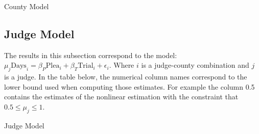 \documentclass[11pt]{article}
\begin{document}
    \begin{table}[H]
      \centering
      \caption{County Model}
      
    \end{table}

    \subsection{Judge Model}
      The results in this subsection correspond to the model: $\mu_j \text{Days}_i = \beta_P \text{Plea}_i + \beta_T \text{Trial}_i + \epsilon_i$. Where $i$ is a judge-county combination and $j$ is a judge. In the table below, the numerical column names correspond to the lower bound used when computing those estimates. For example the column 0.5 contains the estimates of the nonlinear estimation with the constraint that $0.5 \leq \mu_j \leq 1$.

      \begin{table}[H]
        \centering
        \small
        \caption{Judge Model}
        
      \end{table}
\end{document}
